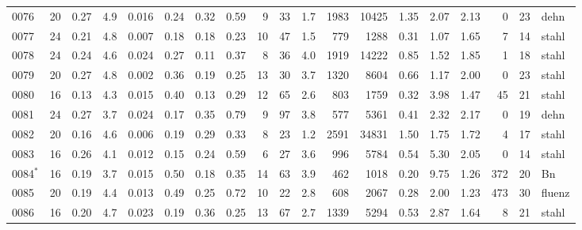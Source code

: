 {\begin{longtable}{@{}lrrrrrrrrrrrrrrrrrl@{}}
0076 & 20 & \num{0.27} & \num{4.9} & \num{0.016} & \num{0.24} & \num{0.32} & \num{0.59} & 9 & \num{33} & \num{1.7} & \num{1983} & \num{10425} & \num{1.35} & \num{2.07} & \num{2.13} & \num{0} & \num{23} & dehn \\
0077 & 24 & \num{0.21} & \num{4.8} & \num{0.007} & \num{0.18} & \num{0.18} & \num{0.23} & 10 & \num{47} & \num{1.5} & \num{779} & \num{1288} & \num{0.31} & \num{1.07} & \num{1.65} & \num{7} & \num{14} & stahl \\
0078 & 24 & \num{0.24} & \num{4.6} & \num{0.024} & \num{0.27} & \num{0.11} & \num{0.37} & 8 & \num{36} & \num{4.0} & \num{1919} & \num{14222} & \num{0.85} & \num{1.52} & \num{1.85} & \num{1} & \num{18} & stahl \\
0079 & 20 & \num{0.27} & \num{4.8} & \num{0.002} & \num{0.36} & \num{0.19} & \num{0.25} & 13 & \num{30} & \num{3.7} & \num{1320} & \num{8604} & \num{0.66} & \num{1.17} & \num{2.00} & \num{0} & \num{23} & stahl \\
0080 & 16 & \num{0.13} & \num{4.3} & \num{0.015} & \num{0.40} & \num{0.13} & \num{0.29} & 12 & \num{65} & \num{2.6} & \num{803} & \num{1759} & \num{0.32} & \num{3.98} & \num{1.47} & \num{45} & \num{21} & stahl \\
0081 & 24 & \num{0.27} & \num{3.7} & \num{0.024} & \num{0.17} & \num{0.35} & \num{0.79} & 9 & \num{97} & \num{3.8} & \num{577} & \num{5361} & \num{0.41} & \num{2.32} & \num{2.17} & \num{0} & \num{19} & dehn \\
0082 & 20 & \num{0.16} & \num{4.6} & \num{0.006} & \num{0.19} & \num{0.29} & \num{0.33} & 8 & \num{23} & \num{1.2} & \num{2591} & \num{34831} & \num{1.50} & \num{1.75} & \num{1.72} & \num{4} & \num{17} & stahl \\
0083 & 16 & \num{0.26} & \num{4.1} & \num{0.012} & \num{0.15} & \num{0.24} & \num{0.59} & 6 & \num{27} & \num{3.6} & \num{996} & \num{5784} & \num{0.54} & \num{5.30} & \num{2.05} & \num{0} & \num{14} & stahl \\
0084$^\ast$ & 16 & \num{0.19} & \num{3.7} & \num{0.015} & \num{0.50} & \num{0.18} & \num{0.35} & 14 & \num{63} & \num{3.9} & \num{462} & \num{1018} & \num{0.20} & \num{9.75} & \num{1.26} & \num{372} & \num{20} & Bn \\
0085 & 20 & \num{0.19} & \num{4.4} & \num{0.013} & \num{0.49} & \num{0.25} & \num{0.72} & 10 & \num{22} & \num{2.8} & \num{608} & \num{2067} & \num{0.28} & \num{2.00} & \num{1.23} & \num{473} & \num{30} & fluenz \\
0086 & 16 & \num{0.20} & \num{4.7} & \num{0.023} & \num{0.19} & \num{0.36} & \num{0.25} & 13 & \num{67} & \num{2.7} & \num{1339} & \num{5294} & \num{0.53} & \num{2.87} & \num{1.64} & \num{8} & \num{21} & stahl \\

\end{longtable}}

